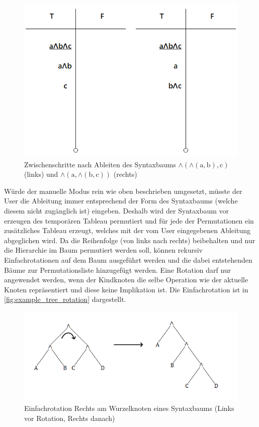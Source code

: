 \begin{figure}[H]
\begin{center}
\includegraphics[scale=0.7]{images/example_different_syntax_trees.png}
\caption{Zwischenschritte nach Ableiten des Syntaxbaums $\wedge(\wedge(\textrm{a},\textrm{b}),\textrm{c})$ (links) und $\wedge(\textrm{a},\wedge(\textrm{b},\textrm{c}))$ (rechts)}
\label{fig:example_different_syntax_trees}
\end{center}
\end{figure}

Würde der manuelle Modus rein wie oben beschrieben umgesetzt, müsste der User die Ableitung immer entsprechend der Form des Syntaxbaums (welche diesem nicht zugänglich ist) eingeben. Deshalb wird der Syntaxbaum vor erzeugen des temporären Tableau permutiert und für jede der Permutationen ein zusätzliches Tableau erzeugt, welches mit der vom User eingegebenen Ableitung abgeglichen wird. Da die Reihenfolge (von links nach rechts) beibehalten und nur die Hierarchie im Baum permutiert werden soll, können rekursiv Einfachrotationen auf dem Baum ausgeführt werden und die dabei entstehenden Bäume zur Permutationsliste hinzugefügt werden. Eine Rotation darf nur angewendet werden, wenn der Kindknoten die selbe Operation wie der aktuelle Knoten repräsentiert und diese keine Implikation ist. Die Einfachrotation ist in \autoref{fig:example_tree_rotation} dargestellt.

\begin{figure}[H]
\begin{center}
\includegraphics[scale=0.7]{images/example_tree_rotation.png}
\caption{Einfachrotation Rechts am Wurzelknoten eines Syntaxbaums (Links vor Rotation, Rechts danach)}
\label{fig:example_tree_rotation}
\end{center}
\end{figure}

